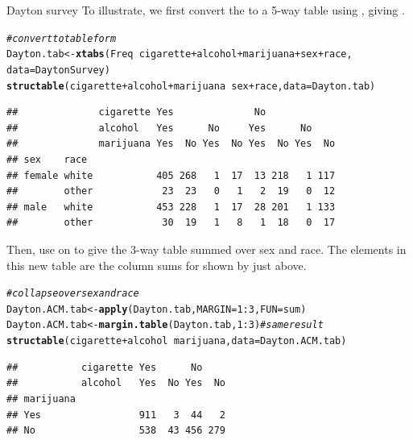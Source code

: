 \documentclass[11pt]{book}\usepackage[]{graphicx}\usepackage[]{color}
\makeatletter
\newcommand{\hlnum}[1]{\textcolor[rgb]{0.686,0.059,0.569}{#1}}%
\newcommand{\hlcom}[1]{\textcolor[rgb]{0.678,0.584,0.686}{\textit{#1}}}%
\newcommand{\hlopt}[1]{\textcolor[rgb]{0,0,0}{#1}}%
\newcommand{\hlstd}[1]{\textcolor[rgb]{0.345,0.345,0.345}{#1}}%
\newcommand{\hlkwb}[1]{\textcolor[rgb]{0.69,0.353,0.396}{#1}}%
\newcommand{\hlkwc}[1]{\textcolor[rgb]{0.333,0.667,0.333}{#1}}%
\newcommand{\hlkwd}[1]{\textcolor[rgb]{0.737,0.353,0.396}{\textbf{#1}}}%
\newenvironment{kframe}{%
 \def\at@end@of@kframe{}%
 \ifinner\ifhmode%
  \def\at@end@of@kframe{\end{minipage}}%
  \begin{minipage}{\columnwidth}%
 \fi\fi%
 \def\FrameCommand##1{\hskip\@totalleftmargin \hskip-\fboxsep
 \colorbox{shadecolor}{##1}\hskip-\fboxsep
     \hskip-\linewidth \hskip-\@totalleftmargin \hskip\columnwidth}%
 \MakeFramed {\advance\hsize-\width
   \@totalleftmargin\z@ \linewidth\hsize
   \@setminipage}}%
 {\par\unskip\endMakeFramed%
 \at@end@of@kframe}
\newenvironment{knitrout}{}{} %
\renewenvironment{knitrout}{\small\renewcommand{\baselinestretch}{.85}}{} %
\makeatother
\begin{document}
\begin{Example}[dayton2]{Dayton survey}
To illustrate, we first convert the  to a 5-way
table using , giving .  

\begin{knitrout}
\color{fgcolor}\begin{kframe}
\begin{alltt}
\hlcom{# convert to table form}
\hlstd{Dayton.tab} \hlkwb{<-} \hlkwd{xtabs}\hlstd{(Freq}\hlopt{~}\hlstd{cigarette}\hlopt{+}\hlstd{alcohol}\hlopt{+}\hlstd{marijuana}\hlopt{+}\hlstd{sex}\hlopt{+}\hlstd{race,}
                    \hlkwc{data}\hlstd{=DaytonSurvey)}
\hlkwd{structable}\hlstd{(cigarette}\hlopt{+}\hlstd{alcohol}\hlopt{+}\hlstd{marijuana} \hlopt{~} \hlstd{sex}\hlopt{+}\hlstd{race,} \hlkwc{data}\hlstd{=Dayton.tab)}
\end{alltt}
\begin{verbatim}
##              cigarette Yes              No            
##              alcohol   Yes      No     Yes      No    
##              marijuana Yes  No Yes  No Yes  No Yes  No
## sex    race                                           
## female white           405 268   1  17  13 218   1 117
##        other            23  23   0   1   2  19   0  12
## male   white           453 228   1  17  28 201   1 133
##        other            30  19   1   8   1  18   0  17
\end{verbatim}
\end{kframe}
\end{knitrout}

Then, use  on  to give the
3-way table  summed over sex and race.
The elements in this new table are the column sums for 
 shown by  just above.

\begin{knitrout}
\color{fgcolor}\begin{kframe}
\begin{alltt}
\hlcom{# collapse over sex and race}
\hlstd{Dayton.ACM.tab} \hlkwb{<-} \hlkwd{apply}\hlstd{(Dayton.tab,} \hlkwc{MARGIN}\hlstd{=}\hlnum{1}\hlopt{:}\hlnum{3}\hlstd{,} \hlkwc{FUN}\hlstd{=sum)}
\hlstd{Dayton.ACM.tab} \hlkwb{<-} \hlkwd{margin.table}\hlstd{(Dayton.tab,} \hlnum{1}\hlopt{:}\hlnum{3}\hlstd{)}   \hlcom{# same result}
\hlkwd{structable}\hlstd{(cigarette}\hlopt{+}\hlstd{alcohol} \hlopt{~} \hlstd{marijuana,} \hlkwc{data}\hlstd{=Dayton.ACM.tab)}
\end{alltt}
\begin{verbatim}
##           cigarette Yes      No    
##           alcohol   Yes  No Yes  No
## marijuana                          
## Yes                 911   3  44   2
## No                  538  43 456 279
\end{verbatim}
\end{kframe}
\end{knitrout}

\end{Example}
\end{document}
